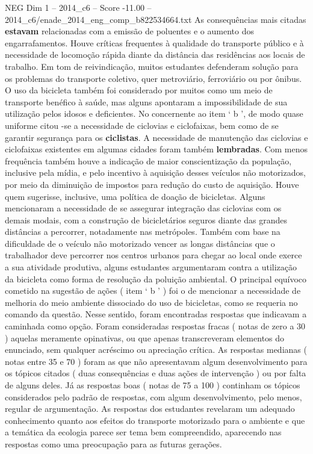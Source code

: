 \begin{textsample}{NEG Dim 1 – 2014\_c6 – Score -11.00 – 2014\_c6/enade\_2014\_eng\_comp\_b822534664.txt}
As consequências mais citadas \textbf{estavam} relacionadas com a emissão de poluentes e o aumento dos engarrafamentos.
Houve críticas frequentes à qualidade do transporte público e à necessidade de locomoção rápida diante da distância das residências aos locais de trabalho.
Em tom de reivindicação, muitos estudantes defenderam solução para os problemas do transporte coletivo, quer metroviário, ferroviário ou por ônibus.
O uso da bicicleta também foi considerado por muitos como um meio de transporte benéfico à saúde, mas alguns apontaram a impossibilidade de sua utilização pelos idosos e deficientes.
No concernente ao item ‘ b ’, de modo quase uniforme citou -se a necessidade de ciclovias e ciclofaixas, bem como de se garantir segurança para os \textbf{ciclistas}.
A necessidade de manutenção das ciclovias e ciclofaixas existentes em algumas cidades foram também \textbf{lembradas}.
Com menos frequência também houve a indicação de maior conscientização da população, inclusive pela mídia, e pelo incentivo à aquisição desses veículos não motorizados, por meio da diminuição de impostos para redução do custo de aquisição.
Houve quem sugerisse, inclusive, uma política de doação de bicicletas.
Alguns mencionaram a necessidade de se assegurar integração das ciclovias com os demais modais, com a construção de bicicletários seguros diante das grandes distâncias a percorrer, notadamente nas metrópoles.
Também com base na dificuldade de o veículo não motorizado vencer as longas distâncias que o trabalhador deve percorrer nos centros urbanos para chegar ao local onde exerce a sua atividade produtiva, alguns estudantes argumentaram contra a utilização da bicicleta como forma de resolução da poluição ambiental.
O principal equívoco cometido na sugestão de ações ( item ‘ b ’ ) foi o de mencionar a necessidade de melhoria do meio ambiente dissociado do uso de bicicletas, como se requeria no comando da questão.
Nesse sentido, foram encontradas respostas que indicavam a caminhada como opção.
Foram consideradas respostas fracas ( notas de zero a 30 ) aquelas meramente opinativas, ou que apenas transcreveram elementos do enunciado, sem qualquer acréscimo ou apreciação crítica.
As respostas medianas ( notas entre 35 e 70 ) foram as que não apresentavam algum desenvolvimento para os tópicos citados ( duas consequências e duas ações de intervenção ) ou por falta de alguns deles.
Já as respostas boas ( notas de 75 a 100 ) continham os tópicos considerados pelo padrão de respostas, com algum desenvolvimento, pelo menos, regular de argumentação.
As respostas dos estudantes revelaram um adequado conhecimento quanto aos efeitos do transporte motorizado para o ambiente e que a temática da ecologia parece ser tema bem compreendido, aparecendo nas respostas como uma preocupação para as futuras gerações.

\end{textsample}
